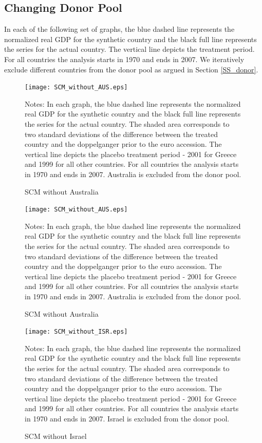 \documentclass[12pt]{article}
\newcommand{\annote}[1]{\parbox{\textwidth}{\renewcommand{\baselinestretch}{1.0}\vspace{12pt} \small Notes: #1}}
\begin{document}
\begin{appendices}
\subsection{Changing Donor Pool \label{SS_donor_appendix}}
In each of the following set of graphs, the blue dashed line represents the normalized real GDP for the synthetic country and the black full line represents the series for the actual country. The vertical line depicts the treatment period. For all countries the analysis starts in 1970 and ends in 2007. We iteratively exclude different countries from the donor pool as argued in Section \ref{SS_donor}.

\begin{figure}[h!]
    \centering
    \label{F_AUS}
    \caption{SCM without Australia}
    \texttt{[image: SCM\_without\_AUS.eps]}
     \annote{In each graph, the blue dashed line represents the normalized real GDP for the synthetic country and the black full line represents the series for the actual country. The shaded area corresponds to two standard deviations of the difference between the treated country and the doppelganger prior to the euro accession. The vertical line depicts the placebo treatment period - 2001 for Greece and 1999 for all other countries. For all countries the analysis starts in 1970 and ends in 2007. Australia is excluded from the donor pool. }
\end{figure}

\begin{figure}[h!]
    \centering
    \label{F_AUS}
    \caption{SCM without Australia}
    \texttt{[image: SCM\_without\_AUS.eps]}
     \annote{In each graph, the blue dashed line represents the normalized real GDP for the synthetic country and the black full line represents the series for the actual country. The shaded area corresponds to two standard deviations of the difference between the treated country and the doppelganger prior to the euro accession. The vertical line depicts the placebo treatment period - 2001 for Greece and 1999 for all other countries. For all countries the analysis starts in 1970 and ends in 2007. Australia is excluded from the donor pool. }
\end{figure}

\begin{figure}[h!]
    \centering
    \label{F_ISR}
    \caption{SCM without Israel}
    \texttt{[image: SCM\_without\_ISR.eps]}
         \annote{In each graph, the blue dashed line represents the normalized real GDP for the synthetic country and the black full line represents the series for the actual country. The shaded area corresponds to two standard deviations of the difference between the treated country and the doppelganger prior to the euro accession. The vertical line depicts the placebo treatment period - 2001 for Greece and 1999 for all other countries. For all countries the analysis starts in 1970 and ends in 2007. Israel is excluded from the donor pool. }
\end{figure}


\end{appendices}
\end{document}
